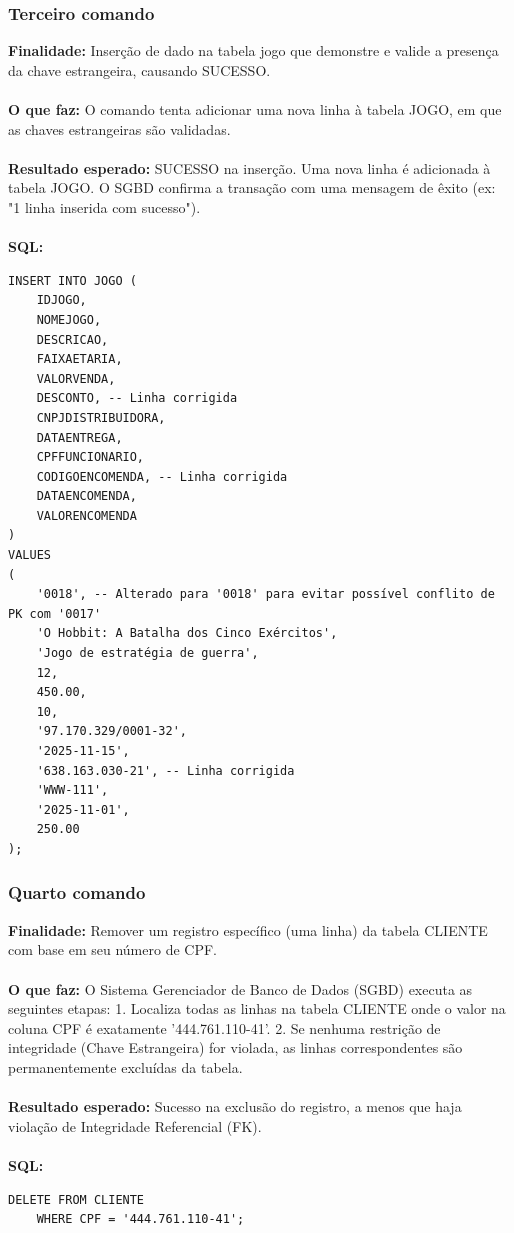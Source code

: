 \documentclass[11pt]{article}
\begin{document}
\subsubsection{Terceiro comando}
\textbf{Finalidade:} Inserção de dado na tabela jogo que demonstre e valide a presença da chave estrangeira, causando SUCESSO.\\\\
\textbf{O que faz:} O comando tenta adicionar uma nova linha à tabela JOGO, em que as chaves estrangeiras são validadas.\\\\
\textbf{Resultado esperado:} SUCESSO na inserção. Uma nova linha é adicionada à tabela JOGO. O SGBD confirma a transação com uma mensagem de êxito (ex: "1 linha inserida com sucesso").\\\\
\textbf{SQL:}
    \begin{Verbatim}[breaklines=true, breakanywhere=true]
    INSERT INTO JOGO (
    IDJOGO, 
    NOMEJOGO, 
    DESCRICAO, 
    FAIXAETARIA, 
    VALORVENDA,
    DESCONTO, -- Linha corrigida
    CNPJDISTRIBUIDORA, 
    DATAENTREGA, 
    CPFFUNCIONARIO,
    CODIGOENCOMENDA, -- Linha corrigida
    DATAENCOMENDA, 
    VALORENCOMENDA
) 
VALUES
(
    '0018', -- Alterado para '0018' para evitar possível conflito de PK com '0017'
    'O Hobbit: A Batalha dos Cinco Exércitos',
    'Jogo de estratégia de guerra',
    12, 
    450.00, 
    10, 
    '97.170.329/0001-32', 
    '2025-11-15',
    '638.163.030-21', -- Linha corrigida
    'WWW-111', 
    '2025-11-01', 
    250.00
);
    \end{Verbatim}

\subsubsection{Quarto comando}
\textbf{Finalidade:} Remover um registro específico (uma linha) da tabela CLIENTE com base em seu número de CPF.\\\\
\textbf{O que faz:} O Sistema Gerenciador de Banco de Dados (SGBD) executa as seguintes etapas:
1. Localiza todas as linhas na tabela CLIENTE onde o valor na coluna CPF é exatamente '444.761.110-41'.
2. Se nenhuma restrição de integridade (Chave Estrangeira) for violada, as linhas correspondentes são permanentemente excluídas da tabela. \\\\
\textbf{Resultado esperado:} Sucesso na exclusão do registro, a menos que haja violação de Integridade Referencial (FK).\\\\
\textbf{SQL:}
    \begin{Verbatim}[breaklines=true, breakanywhere=true]
    DELETE FROM CLIENTE
    WHERE CPF = '444.761.110-41';
    \end{Verbatim}

    
\end{document}
